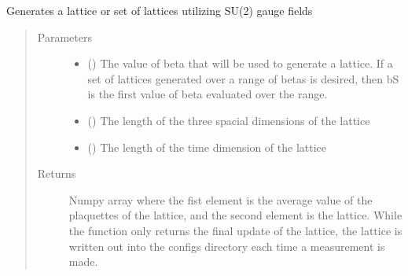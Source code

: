 \documentclass[letterpaper,10pt,english]{sphinxmanual}
\begin{document}
\label{\detokenize{index:module-field_gen}}

\begin{fulllineitems}
\label{\detokenize{index:field_gen.lattice}}
Generates a lattice or set of lattices utilizing SU(2) gauge fields
\begin{quote}\begin{description}
\item[{Parameters}] \leavevmode\begin{itemize}
\item {} 
 () \textendash{} The value of beta that will be used to generate a lattice. If
a set of lattices generated over a range of betas is desired,
then bS is the first value of beta evaluated over the range.

\item {} 
 () \textendash{} The length of the three spacial dimensions of the lattice

\item {} 
 () \textendash{} The length of the time dimension of the lattice

\end{itemize}

\item[{Returns}] \leavevmode
{} \textendash{} Numpy array where the fist element is the average value of
the plaquettes of the lattice, and the second element is the
lattice. While the function only returns the final update of
the lattice, the lattice is written out into the configs
directory each time a measurement is made.


\end{description}
\end{quote}
\end{fulllineitems}
\end{document}
